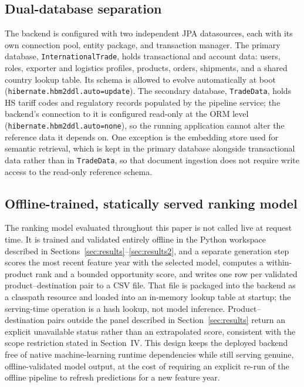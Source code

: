 \documentclass[conference]{IEEEtran}
\begin{document}
\subsection{Dual-database separation}

The backend is configured with two independent JPA datasources, each with its own connection pool, entity package, and transaction manager. The primary database, \texttt{InternationalTrade}, holds transactional and account data: users, roles, exporter and logistics profiles, products, orders, shipments, and a shared country lookup table. Its schema is allowed to evolve automatically at boot (\texttt{hibernate.hbm2ddl.auto=update}). The secondary database, \texttt{TradeData}, holds HS tariff codes and regulatory records populated by the pipeline service; the backend's connection to it is configured read-only at the ORM level (\texttt{hibernate.hbm2ddl.auto=none}), so the running application cannot alter the reference data it depends on. One exception is the embedding store used for semantic retrieval, which is kept in the primary database alongside transactional data rather than in \texttt{TradeData}, so that document ingestion does not require write access to the read-only reference schema.

\subsection{Offline-trained, statically served ranking model}

The ranking model evaluated throughout this paper is not called live at request time. It is trained and validated entirely offline in the Python workspace described in Sections~\ref{sec:results}--\ref{sec:results2}, and a separate generation step scores the most recent feature year with the selected model, computes a within-product rank and a bounded opportunity score, and writes one row per validated product--destination pair to a CSV file. That file is packaged into the backend as a classpath resource and loaded into an in-memory lookup table at startup; the serving-time operation is a hash lookup, not model inference. Product--destination pairs outside the panel described in Section~\ref{sec:results} return an explicit unavailable status rather than an extrapolated score, consistent with the scope restriction stated in Section~IV. This design keeps the deployed backend free of native machine-learning runtime dependencies while still serving genuine, offline-validated model output, at the cost of requiring an explicit re-run of the offline pipeline to refresh predictions for a new feature year.
\end{document}
